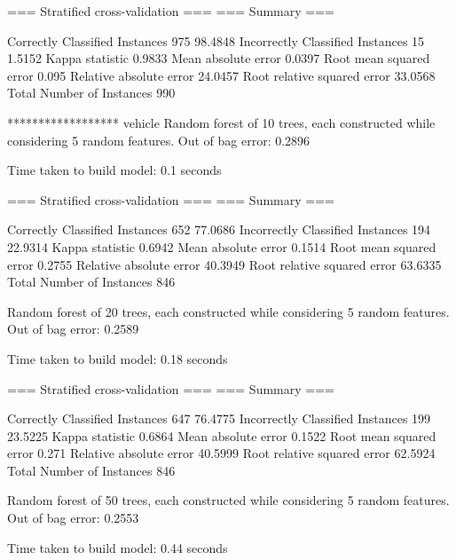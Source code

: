 === Stratified cross-validation ===
=== Summary ===

Correctly Classified Instances         975               98.4848 %
Incorrectly Classified Instances        15                1.5152 %
Kappa statistic                          0.9833
Mean absolute error                      0.0397
Root mean squared error                  0.095 
Relative absolute error                 24.0457 %
Root relative squared error             33.0568 %
Total Number of Instances              990     




****************** vehicle
Random forest of 10 trees, each constructed while considering 5 random features.
Out of bag error: 0.2896



Time taken to build model: 0.1 seconds

=== Stratified cross-validation ===
=== Summary ===

Correctly Classified Instances         652               77.0686 %
Incorrectly Classified Instances       194               22.9314 %
Kappa statistic                          0.6942
Mean absolute error                      0.1514
Root mean squared error                  0.2755
Relative absolute error                 40.3949 %
Root relative squared error             63.6335 %
Total Number of Instances              846     




Random forest of 20 trees, each constructed while considering 5 random features.
Out of bag error: 0.2589



Time taken to build model: 0.18 seconds

=== Stratified cross-validation ===
=== Summary ===

Correctly Classified Instances         647               76.4775 %
Incorrectly Classified Instances       199               23.5225 %
Kappa statistic                          0.6864
Mean absolute error                      0.1522
Root mean squared error                  0.271 
Relative absolute error                 40.5999 %
Root relative squared error             62.5924 %
Total Number of Instances              846     




Random forest of 50 trees, each constructed while considering 5 random features.
Out of bag error: 0.2553



Time taken to build model: 0.44 seconds

